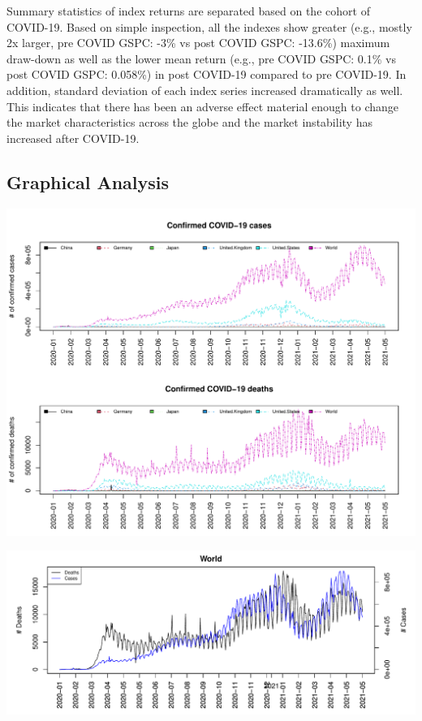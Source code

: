 \documentclass[
  11pt,
]{article}
\begin{document}
Summary statistics of index returns are separated based on the cohort of
COVID-19. Based on simple inspection, all the indexes show greater
(e.g., mostly 2x larger, pre COVID GSPC: -3\% vs post COVID GSPC:
-13.6\%) maximum draw-down as well as the lower mean return (e.g., pre
COVID GSPC: 0.1\% vs post COVID GSPC: 0.058\%) in post COVID-19 compared
to pre COVID-19. In addition, standard deviation of each index series
increased dramatically as well. This indicates that there has been an
adverse effect material enough to change the market characteristics
across the globe and the market instability has increased after
COVID-19.

\hypertarget{graphical-analysis}{%
\subsection{Graphical Analysis}\label{graphical-analysis}}

\includegraphics{ST436_Project_files/figure-latex/unnamed-chunk-35-1.pdf}

\includegraphics{ST436_Project_files/figure-latex/unnamed-chunk-36-1.pdf}
\end{document}
